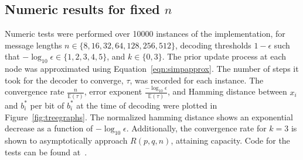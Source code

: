 \documentclass{IEEEtran}
\begin{document}
\subsection{Numeric results for fixed $n$}
Numeric tests were performed over 10000 instances of the implementation, for
message lengths $n \in\{8,16,32,64,128,256,512\}$, decoding thresholds
$1-\epsilon $ such that
$-\log_{10}\epsilon \in \{1,2,3,4,5\}$, and $k\in\{0,3\}$. The prior update
process at each node was approximated using Equation~\ref{eqn:simpapprox}.
The number of steps it took
for the decoder to converge, $\tau$, was recorded for each instance.
The convergence rate $\frac{n}{\mathbb{E}(\tau)}$, error exponent
$\frac{-\log_{10}\epsilon}{\mathbb{E}(\tau)}$, and Hamming distance between
$x_i$ and $b_i^*$ per bit of $b_i^*$ at the time of decoding were
plotted in Figure~\ref{fig:treegraphs}. The normalized hamming distance shows
an exponential decrease as a function of $-\log_{10}\epsilon$. Additionally,
the convergence rate for $k=3$ is shown to asymptotically approach $R(p,q,n)$,
attaining capacity. Code for the tests can be found at~\cite{cataltepecausal}.
\end{document}

